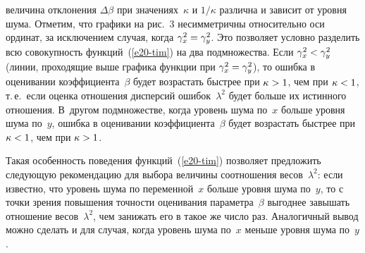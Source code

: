 \begin{multicols}{2}

\addtocounter{figure}{1}



\noindent
 величина отклонения $\Delta\beta$ при
значениях~$\kappa$ и $1/\kappa$  различна и зависит от уровня шума.
Отметим, что графики на рис.~3 несимметричны относительно оси ординат,
за исключением случая, когда $\gamma_x^2\hm=\gamma_y^2$. Это
позволяет условно разделить всю совокупность функций~(\ref{e20-tim}) на
два подмножества. Если $\gamma_x^2\hm<\gamma_y^2$ (линии, проходящие
выше графика функции при $\gamma_x^2\hm=\gamma_y^2$), то ошибка в
оценивании коэффициента~$\beta$ будет возрастать быстрее при
$\kappa\hm>1$, чем при $\kappa\hm<1$, т.\,е.\ если оценка отношения
дисперсий ошибок~$\lambda^2$ будет больше их истинного отношения.
В~другом подмножестве, когда уровень шума по~$x$ больше уровня шума
по~$y$, ошибка в оценивании коэффициента~$\beta$ будет возрастать
быстрее при $\kappa\hm<1$, чем при $\kappa\hm>1$.


  Такая особенность поведения функций~(\ref{e20-tim}) позволяет
предложить следующую рекомендацию для выбора величины соотношения
весов~$\lambda^2$: если известно, что уровень шума по переменной~$x$
больше уровня шума по~$y$, то с точки зрения повышения точности
оценивания параметра~$\beta$ выгоднее завышать отношение
весов~$\lambda^2$, чем занижать его в такое же число раз. Аналогичный
вывод можно сделать и для случая, когда уровень шума по~$x$ меньше
уровня шума по~$y$.


\end{multicols}
